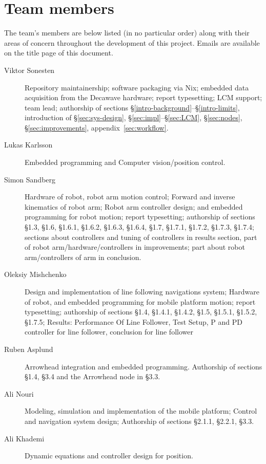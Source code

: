 \section{Team members}
The team's members are below listed (in no particular order) along with their areas of concern throughout the development of this project.
Emails are available on the title page of this document.

\begin{description}
\item[Viktor Sonesten] Repository maintainership; software packaging via
  Nix; embedded data acquisition from the Decawave hardware; report
  typesetting; LCM support; team lead; authorship of sections
  §\ref{intro-background}--§\ref{intro-limits}, introduction of
  §\ref{sec:sys-design}, §\ref{sec:impl}--§\ref{sec:LCM},
  §\ref{sec:nodes}, §\ref{sec:improvements},
  appendix~\ref{sec:workflow}.

    \item[Lukas Karlsson]
    Embedded programming and
    Computer vision/position control.

    \item[Simon Sandberg]
    Hardware of robot, robot arm motion control;
    Forward and inverse kinematics of robot arm;
    Robot arm controller design;
    and embedded programming for robot motion; report
    typesetting; authorship of sections §1.3, §1.6, §1.6.1, §1.6.2, §1.6.3, §1.6.4, §1.7, §1.7.1, §1.7.2, §1.7.3, §1.7.4;
    sections about controllers and tuning of controllers in results section, part of robot arm/hardware/controllers in improvements;
    part about robot arm/controllers of arm in conclusion.

    \item[Oleksiy Mishchenko]
    Design and implementation of line following navigations system;
    Hardware of robot, and embedded programming for mobile platform motion; report
     typesetting; authorship of sections §1.4, §1.4.1, §1.4.2, §1.5, §1.5.1, §1.5.2, §1.7.5;
     Results: Performance Of Line Follower, Test Setup, P and PD controller for line follower, conclusion for line follower

    \item[Ruben Asplund]
    Arrowhead integration and embedded programming.
    Authorship of sections §1.4, §3.4 and the Arrowhead node in §3.3.

    \item[Ali Nouri]
    Modeling, simulation and implementation of the mobile platform;
    Control and navigation system design;
    Authorship of sections §2.1.1, §2.2.1, §3.3.

    \item[Ali Khademi]
    Dynamic equations and controller design for position.
\end{description}
